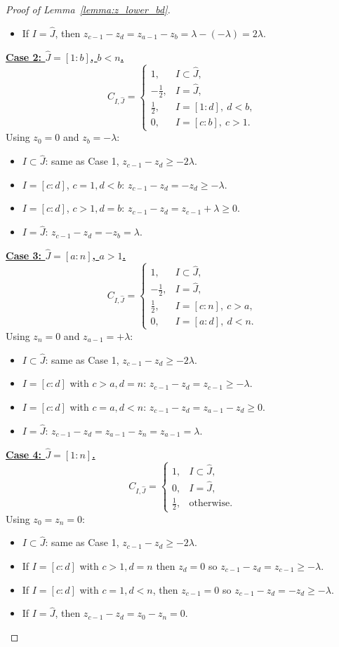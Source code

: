 \documentclass[11pt]{article}
\theoremstyle{plain}
\theoremstyle{definition}
\theoremstyle{remark}
\begin{document}
\begin{appendix}
\begin{proof} [Proof of Lemma~\ref{lemma:z_lower_bd}]
\begin{itemize}
\item If $I=\hat{J}$, then $z_{c-1}-z_d = z_{a-1}-z_b = \lambda-(-\lambda)=2\lambda.$
\end{itemize}

\medskip
\noindent\underline{\textbf{Case 2: $\hat{J}=[1:b]$, $b<n$.}}
\[
C_{I,\hat{J}}=
\begin{cases}
1, & I\subset \hat{J},\\
-\tfrac12, & I=\hat{J},\\
\tfrac12, & I=[1:d],\ d<b,\\
0, & I=[c:b],\ c>1.
\end{cases}
\]
Using $z_0=0$ and $z_b=-\lambda$:
\begin{itemize}
\item $I\subset \hat{J}$: same as Case 1, $z_{c-1}-z_d \geq -2\lambda$.
\item $I=[c:d]$, $c = 1, d<b$: $z_{c-1}-z_d=-z_d \geq -\lambda$.
\item $I=[c:d]$, $c>1, d = b$: $z_{c-1}-z_d = z_{c-1}+\lambda \ge 0$.
\item $I=\hat{J}$: $z_{c-1}-z_d=-z_b = \lambda$.
\end{itemize}

\medskip
\noindent\underline{\textbf{Case 3: $\hat{J}=[a:n]$, $a>1$.}}
\[
C_{I,\hat{J}}=
\begin{cases}
1, & I\subset \hat{J},\\
-\tfrac12, & I=\hat{J},\\
\tfrac12, & I=[c:n],\ c>a,\\
0, & I=[a:d],\ d<n.
\end{cases}
\]
Using $z_n=0$ and $z_{a-1}=+\lambda$:
\begin{itemize}
\item $I\subset \hat{J}$: same as Case 1, $z_{c-1}-z_d \geq -2\lambda$.
\item $I=[c:d]$ with $c>a, d=n$: $z_{c-1}-z_d=z_{c-1}\ge -\lambda$.
\item $I=[c:d]$ with $c=a, d<n$: $z_{c-1}-z_d=z_{a-1}-z_d\ge 0$.
\item $I=\hat{J}$: $z_{c-1}-z_d=z_{a-1}-z_n=z_{a-1}=\lambda$.
\end{itemize}

\medskip
\noindent\underline{\textbf{Case 4: $\hat{J}=[1:n]$.}}
\[
C_{I,\hat{J}}=
\begin{cases}
1, & I\subset \hat{J},\\
0, & I=\hat{J},\\
\tfrac12, & \text{otherwise}.
\end{cases}
\]
Using $z_0=z_n=0$:
\begin{itemize}
\item $I\subset \hat{J}$: same as Case 1, $z_{c-1}-z_d \geq -2\lambda$.
\item If $I=[c:d]$ with $c > 1, d = n$ then $z_d=0$ so $z_{c-1}-z_d = z_{c-1} \geq -\lambda.$
\item If $I=[c:d]$ with $c = 1,d < n$, then $z_{c-1}=0$ so $z_{c-1}- z_d = -z_d \geq -\lambda.$
\item If $I=\hat{J}$, then $z_{c-1}-z_d  = z_0 - z_n = 0.$
\end{itemize}


\end{proof}
\end{appendix}
\end{document}
